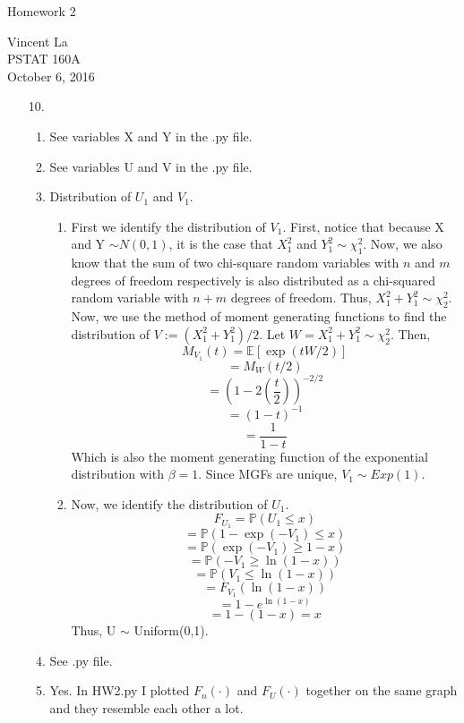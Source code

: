 \documentclass[11pt]{article}
\title{ }
\begin{document}
	\begin{center}	%
		\Large{Homework 2}	%
	\end{center}
	\begin{center}
		Vincent La \\
		PSTAT 160A \\
		October 6, 2016
	\end{center}

\begin{enumerate}

\item[10.]
	\begin{enumerate}
		\item See variables X and Y in the .py file.
		\item See variables U and V in the .py file.
		\item Distribution of $U_1$ and $V_1$.
        \begin{enumerate}
            \item First we identify the distribution of $V_1$.
            First, notice that because X and Y $\sim N(0,1)$, it is the case that 
            $X^2_1$ and $Y^2_1 \sim \chi^2_1$.           
            Now, we also know that the sum of two chi-square random variables with $n$ and $m$
            degrees of freedom respectively is also distributed as a chi-squared random variable with $n + m$ degrees of freedom.
            Thus, $X^2_1 + Y^2_1 \sim \chi^2_2$. Now, we use the method of moment generating 
            functions to find the distribution of $V := (X^2_1 + Y^2_1)/2$.
            Let $W = X^2_1 + Y^2_1 \sim \chi^2_2$. Then,
            \[ M_{V_1}(t) = \mathbb{E}[\exp(tW/2)] \]
            \[= M_W(t/2)\]
            \[= (1-2(\frac{t}{2}))^{-2/2}\]
            \[= (1-t)^{-1}\]
            \[= \frac{1}{1-t} \]
            Which is also the moment generating function of the exponential distribution with $\beta = 1$. Since MGFs are unique, $V_1 \sim Exp(1)$.
            \item Now, we identify the distribution of $U_1$.
            \[F_{U_1} = \mathbb{P}(U_1 \leq x)  \]
            \[= \mathbb{P}(1 - \exp(-V_1) \leq x)\]
            \[= \mathbb{P}(\exp(-V_1) \geq 1-x)\]
            \[= \mathbb{P}(-V_1 \geq \ln(1-x))\]
            \[= \mathbb{P}(V_1 \leq \ln(1-x))\]
            \[= F_{V_1}(\ln(1-x))\]
            \[= 1 - e^{\ln(1-x)} \]
            \[= 1 - (1-x) = x \]
	        Thus, U $\sim$ Uniform(0,1).
        \end{enumerate}
		\item See .py file.
        \item Yes. In HW2.py I plotted $F_n(\cdot)$ and $F_U(\cdot)$ together on the same graph and they resemble each other a lot.
	\end{enumerate}
\end{enumerate}
\end{document}
